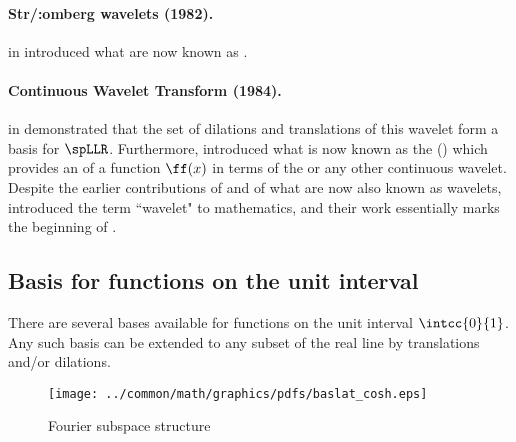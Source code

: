 \paragraph{Str/:omberg wavelets (1982).}
\citeauthor{stromberg1982} in \citeyear{stromberg1982} introduced what are now known as .\footnotemark
{}

\paragraph{Continuous Wavelet Transform (1984).}
 in \citeyear{grossman1984}
demonstrated that the  set of dilations and translations of this wavelet form a  basis for $\spLLR$.
Furthermore,  introduced what is now known as the 
 () which provides an  of a function $\ff(x)$
in terms of the  or any other continuous wavelet.
Despite the earlier contributions of \citeauthor{haar1910} \citeyearpar{haar1910}
and \citeauthor{ricker1953} \citeyearpar{ricker1953} of what are now also known as wavelets,
 introduced the term ``wavelet" to mathematics, and 
their work essentially marks the beginning of .\footnotemark



\subsection{Basis for functions on the unit interval}
There are several bases available for functions on the unit interval $\intcc{0}{1}$.
Any such basis can be extended to any subset of the real line by translations and/or dilations.

\begin{figure}[h]
  \gsize%
  \centering%
  \texttt{[image: ../common/math/graphics/pdfs/baslat\_cosh.eps]}%
  \caption{Fourier subspace structure \label{fig:baslat_cosh}}
\end{figure}
